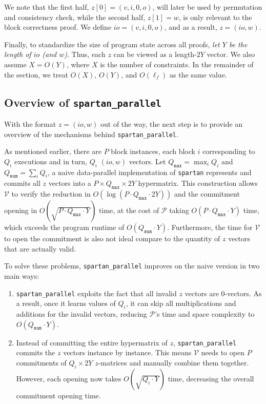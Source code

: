 \documentclass{article}
\newcommand{\code}{\texttt}
\newcommand{\Qsum}{Q_{\mathtt{sum}}}
\newcommand{\Qmax}{Q_{\mathtt{max}}}
\renewcommand{\P}{\mathcal{P}}
\newcommand{\V}{\mathcal{V}}
\begin{document}
We note that the first half, $z[0] = (v, i, 0, o)$, will later be used by permutation and consistency check, while the second half, $z[1] = w$, is only relevant to the block correctness proof. We define $io = (v, i, 0, o)$, and as a result, $z = (io, w)$.

Finally, to standardize the size of program state across all proofs, \emph{let $Y$ be the length of $io$ (and $w$)}. Thus, each $z$ can be viewed as a length-$2Y$ vector. We also assume $X = O(Y)$, where $X$ is the number of constraints. In the remainder of the section, we treat $O(X)$, $O(Y)$, and $O(\ell_f)$ as the same value.

\subsection{Overview of \code{spartan\_parallel}}
With the format $z = (io, w)$ out of the way, the next step is to provide an overview of the mechanisms behind \code{spartan\_parallel}.

As mentioned earlier, there are $P$ block instances, each block $i$ corresponding to $Q_i$ executions and in turn, $Q_i$ $(io, w)$ vectors. Let $\Qmax = \max_i Q_i$ and $\Qsum = \sum_i Q_i$, a naive data-parallel implementation of \code{spartan} represents and commits all $z$ vectors into a $P\times \Qmax\times 2Y$ hypermatrix. This construction allows $\V$ to verify the reduction in $O(\log (P\cdot \Qmax\cdot 2Y))$ and the commitment opening in $O(\sqrt{P\cdot \Qmax\cdot Y})$ time, at the cost of $\P$ taking $O(P\cdot \Qmax\cdot Y)$ time, which exceeds the program runtime of $O(\Qsum\cdot Y)$. Furthermore, the time for $\V$ to open the commitment is also not ideal compare to the quantity of $z$ vectors that are actually valid.

To solve these problems, \code{spartan\_parallel} improves on the naive version in two main ways:
\begin{enumerate}
    \item \code{spartan\_parallel} exploits the fact that all invalid $z$ vectors are 0-vectors. As a result, once it learns values of $Q_i$, it can skip all multiplications and additions for the invalid vectors, reducing $\P$'s time and space complexity to $O(\Qsum\cdot Y)$.
    \item Instead of committing the entire hypermatrix of $z$, \code{spartan\_parallel} commits the $z$ vectors instance by instance. This means $\V$ needs to open $P$ commitments of $Q_i\times 2Y$ $z$-matrices and manually combine them together. However, each opening now takes $O(\sqrt{Q_i\cdot Y})$ time, decreasing the overall commitment opening time.
\end{enumerate}
\end{document}
